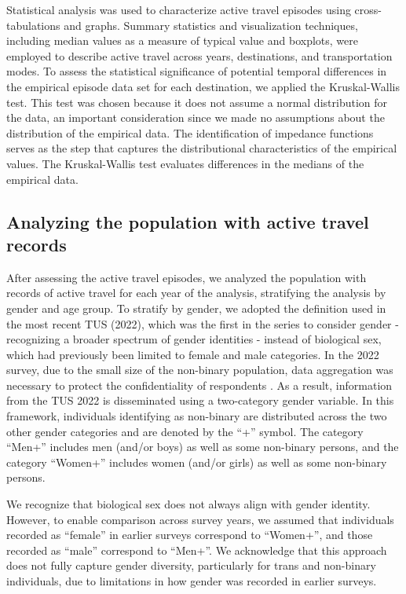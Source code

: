 \documentclass[preprint, 3p,
authoryear]{elsarticle} %
\begin{document}
Statistical analysis was used to characterize active travel episodes
using cross-tabulations and graphs. Summary statistics and visualization
techniques, including median values as a measure of typical value and
boxplots, were employed to describe active travel across years,
destinations, and transportation modes. To assess the statistical
significance of potential temporal differences in the empirical episode
data set for each destination, we applied the Kruskal-Wallis test. This
test was chosen because it does not assume a normal distribution for the
data, an important consideration since we made no assumptions about the
distribution of the empirical data. The identification of impedance
functions serves as the step that captures the distributional
characteristics of the empirical values. The Kruskal-Wallis test
evaluates differences in the medians of the empirical data.

\subsection{Analyzing the population with active travel
records}\label{analyzing-the-population-with-active-travel-records}

After assessing the active travel episodes, we analyzed the population
with records of active travel for each year of the analysis, stratifying
the analysis by gender and age group. To stratify by gender, we adopted
the definition used in the most recent TUS (2022), which was the first
in the series to consider gender - recognizing a broader spectrum of
gender identities - instead of biological sex, which had previously been
limited to female and male categories. In the 2022 survey, due to the
small size of the non-binary population, data aggregation was necessary
to protect the confidentiality of respondents
\citep{statisticscanada2025}. As a result, information from the TUS 2022
is disseminated using a two-category gender variable. In this framework,
individuals identifying as non-binary are distributed across the two
other gender categories and are denoted by the ``+'' symbol. The
category ``Men+'' includes men (and/or boys) as well as some non-binary
persons, and the category ``Women+'' includes women (and/or girls) as
well as some non-binary persons.

We recognize that biological sex does not always align with gender
identity. However, to enable comparison across survey years, we assumed
that individuals recorded as ``female'' in earlier surveys correspond to
``Women+'', and those recorded as ``male'' correspond to ``Men+''. We
acknowledge that this approach does not fully capture gender diversity,
particularly for trans and non-binary individuals, due to limitations in
how gender was recorded in earlier surveys.
\end{document}
